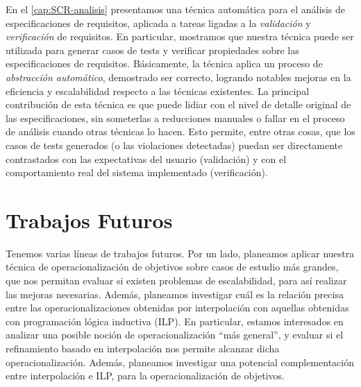 En el \cref{cap:SCR-analisis} presentamos una t\'ecnica autom\'atica para el an\'alisis de especificaciones de requisitos, aplicada a tareas ligadas a la \emph{validaci\'on} y \emph{verificaci\'on} de requisitos.
En particular, mostramos que nuestra t\'ecnica puede ser utilizada para generar casos de tests y verificar propiedades sobre las especificaciones de requisitos. 
B\'asicamente, la t\'ecnica aplica un proceso de \emph{abstracci\'on autom\'atico}, demostrado ser correcto, logrando notables mejoras en la eficiencia y escalabilidad respecto a las t\'ecnicas existentes. La principal contribuci\'on de esta t\'ecnica es que puede lidiar con el nivel de detalle original de las especificaciones, sin someterlas a reducciones manuales o fallar en el proceso de an\'alisis cuando otras t\'ecnicas lo hacen. Esto permite, entre otras cosas, que los casos de tests generados (o las violaciones detectadas) puedan ser directamente contrastados con las expectativas del usuario (validaci\'on) y con el comportamiento real del sistema implementado (verificaci\'on). 




\section{Trabajos Futuros}

Tenemos varias l\'ineas de trabajos futuros. 
Por un lado, planeamos aplicar nuestra t\'ecnica de operacionalizaci\'on de objetivos sobre casos de estudio m\'as grandes, que nos permitan evaluar si existen problemas de escalabilidad, para as\'i realizar las mejoras necesarias. Adem\'as, planeamos investigar cu\'al es la relaci\'on precisa entre las operacionalizaciones obtenidas por interpolaci\'on con aquellas obtenidas con programaci\'on l\'ogica inductiva (ILP). En particular, estamos interesados en analizar una posible noci\'on de operacionalizaci\'on ``m\'as general'', y evaluar si el refinamiento basado en interpolaci\'on nos permite alcanzar dicha operacionalizaci\'on.  Adem\'as, planeamos investigar una potencial complementaci\'on entre interpolaci\'on e ILP, para la operacionalizaci\'on de objetivos. 

